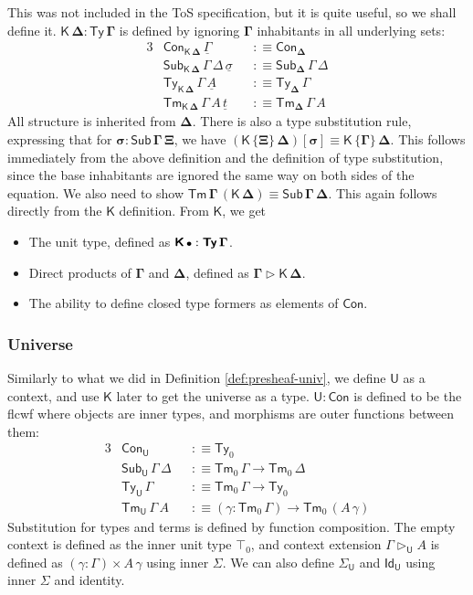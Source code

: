 \documentclass[12pt,a4paper,twoside,openany]{book}
\theoremstyle{remark}
\theoremstyle{definition}
\theoremstyle{theorem}
\newcommand{\bs}[1]{\boldsymbol{#1}}
\newcommand{\Con}{\mathsf{Con}}
\newcommand{\Sub}{\mathsf{Sub}}
\newcommand{\Tm}{\mathsf{Tm}}
\newcommand{\Ty}{\mathsf{Ty}}
\newcommand{\U}{\mathsf{U}}
\newcommand{\Id}{\mathsf{Id}}
\newcommand{\ext}{\triangleright}
\newcommand{\K}{\mathsf{K}}
\newcommand{\bCon}{\bs{\Con}}
\newcommand{\bTy}{\bs{\Ty}}
\newcommand{\bGamma}{\bs{\Gamma}}
\newcommand{\bDelta}{\bs{\Delta}}
\newcommand{\bemptycon}{\scaleobj{.75}{\bs{\bullet}}}
\newcommand{\bU}{\bs{\U}}
\newcommand{\bK}{\bs{\mathsf{K}}}
\newcommand{\ul}[1]{\underline{#1}}
\newcommand{\ulGamma}{\ul{\Gamma}}
\newcommand{\ulsigma}{\ul{\sigma}}
\newcommand{\ult}{\ul{t}}
\newcommand{\ulA}{\ul{A}}
\newcommand{\defn}{:\equiv}
\begin{document}
This was not included in the ToS specification, but it is quite useful, so we
shall define it. $\bs{\K\,\Delta : \Ty\,\Gamma}$ is defined by ignoring
$\bGamma$ inhabitants in all underlying sets:
\begin{alignat*}{3}
  & \Con_{\bs{\K\,\Delta}}\,\ulGamma &&\defn \Con_{\bDelta}\\
  & \Sub_{\bs{\K\,\Delta}}\,\Gamma\,\Delta\,\ulsigma &&\defn \Sub_{\bDelta}\,\Gamma\,\Delta\\
  &  \Ty_{\bs{\K\,\Delta}}\,\Gamma\,\ulA &&\defn \Ty_{\bDelta}\,\Gamma\\
  &  \Tm_{\bs{\K\,\Delta}}\,\Gamma\,A\,\ult &&\defn \Tm_{\bDelta}\,\Gamma\,A
\end{alignat*}
All structure is inherited from $\bDelta$. There is also a type substitution
rule, expressing that for $\bs{\sigma : \Sub\,\Gamma\,\Xi}$, we have
$\bs{(\K\,\{\Xi\}\,\Delta)[\sigma]} \equiv \bs{\K\,\{\Gamma\}\,\Delta}$. This
follows immediately from the above definition and the definition of type
substitution, since the base inhabitants are ignored the same way on both sides
of the equation. We also need to show $\bs{\Tm\,\Gamma\,(\K\,\Delta)} \equiv
\bs{\Sub\,\Gamma\,\Delta}$. This again follows directly from the $\bK$
definition. From $\bK$, we get
\begin{itemize}
\item The unit type, defined as $\bK\,\bemptycon : \bTy\,\bGamma$.
\item Direct products of $\bGamma$ and $\bDelta$, defined as $\bs{\Gamma \ext \K\,\Delta}$.
\item The ability to define closed type formers as elements of $\bCon$.
\end{itemize}

\subsubsection{Universe}

Similarly to what we did in Definition \ref{def:presheaf-univ}, we define $\bU$
as a context, and use $\bK$ later to get the universe as a type. $\bU :
\bCon$ is defined to be the flcwf where objects are inner types, and morphisms
are outer functions between them:
\begin{alignat*}{3}
  &\Con_{\bU} &&\defn \Ty_0 \\
  &\Sub_{\bU}\,\Gamma\,\Delta &&\defn \Tm_0\,\Gamma \to \Tm_0\,\Delta \\
  &\Ty_{\bU}\,\Gamma    &&\defn \Tm_0\,\Gamma \to \Ty_0\\
  &\Tm_{\bU}\,\Gamma\,A &&\defn (\gamma : \Tm_0\,\Gamma) \to \Tm_0\,(A\,\gamma)
\end{alignat*}
Substitution for types and terms is defined by function composition. The empty
context is defined as the inner unit type $\top_0$, and context extension
$\Gamma \ext_{\bU} A$ is defined as $(\gamma : \Gamma) \times A\,\gamma$ using
inner $\Sigma$. We can also define $\Sigma_{\bU}$ and $\Id_{\bU}$ using inner
$\Sigma$ and identity.
\end{document}
